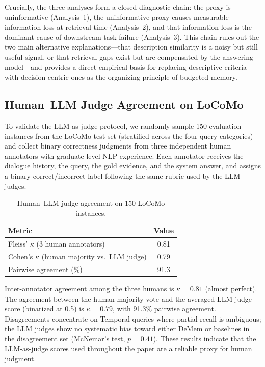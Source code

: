 \documentclass{article}
\theoremstyle{plain}
\theoremstyle{definition}
\theoremstyle{remark}
\begin{document}
Crucially, the three analyses form a closed diagnostic chain: the
proxy is uninformative (Analysis~1), the uninformative proxy causes
measurable information loss at retrieval time (Analysis~2), and that
information loss is the dominant cause of downstream task failure
(Analysis~3). This chain rules out the two main alternative
explanations---that description similarity is a noisy but still
useful signal, or that retrieval gaps exist but are compensated by
the answering model---and provides a direct empirical basis for
replacing descriptive criteria with decision-centric ones as the
organizing principle of budgeted memory.

\subsection{Human--LLM Judge Agreement on LoCoMo}
\label{app:human-judge}

To validate the LLM-as-judge protocol, we randomly sample 150 evaluation
instances from the LoCoMo test set (stratified across the four query
categories) and collect binary correctness judgments from three independent
human annotators with graduate-level NLP experience. Each annotator receives
the dialogue history, the query, the gold evidence, and the system answer,
and assigns a binary correct/incorrect label following the same rubric used
by the LLM judges.

\begin{table}[h]
\centering
\small
\caption{Human--LLM judge agreement on 150 LoCoMo instances.}
\label{tab:human-judge}
\begin{tabular}{lc}
\toprule
Metric & Value \\
\midrule
Fleiss' $\kappa$ (3 human annotators) & 0.81 \\
Cohen's $\kappa$ (human majority vs.\ LLM judge) & 0.79 \\
Pairwise agreement (\%) & 91.3 \\
\bottomrule
\end{tabular}
\end{table}

Inter-annotator agreement among the three humans is $\kappa = 0.81$
(almost perfect). The agreement between the human majority vote and the
averaged LLM judge score (binarized at 0.5) is $\kappa = 0.79$, with
91.3\% pairwise agreement. Disagreements concentrate on Temporal queries
where partial recall is ambiguous; the LLM judges show no systematic bias
toward either DeMem or baselines in the disagreement set (McNemar's test,
$p = 0.41$). These results indicate that the LLM-as-judge scores used
throughout the paper are a reliable proxy for human judgment.
\end{document}
